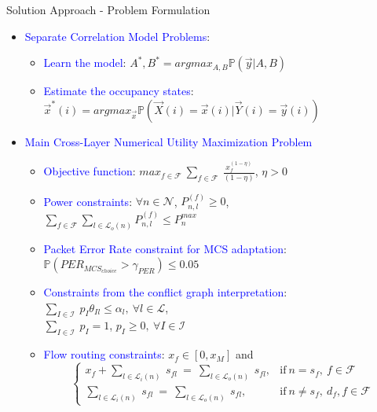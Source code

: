\documentclass{beamer}
\begin{document}
\begin{frame}{Solution Approach - Problem Formulation}
    \begin{itemize}
        \item \textcolor{blue}{Separate Correlation Model Problems}:
        \begin{itemize}
            \item \textcolor{blue}{Learn the model}:
            $A^*, B^* = argmax_{A, B} \mathbb{P}(\vec{y} | A, B)$
            \begingroup
            \fontsize{8pt}{8pt}\selectfont
                [MLE]
            \endgroup
            \item \textcolor{blue}{Estimate the occupancy states}: 
            $\Vec{x}^*(i) = argmax_{\Vec{x}} \mathbb{P}(\Vec{X}(i)=\Vec{x}(i)|\Vec{Y}(i)=\Vec{y}(i))$
            \begingroup
            \fontsize{8pt}{8pt}\selectfont
                [MAP]
            \endgroup
        \end{itemize}
        \item \textcolor{blue}{Main Cross-Layer Numerical Utility Maximization Problem}
        \begin{itemize}
            \item \textcolor{blue}{Objective function}: $max_{f \in \mathcal{F}}\ \sum_{f \in \mathcal{F}}\ \frac{x_f^{(1-\eta)}}{(1-\eta)}$, $\eta > 0$
            \item \textcolor{blue}{Power constraints}: $\forall n \in \mathcal{N}$, 
            $P_{n, l}^{(f)} \geq 0$, 
            \\$\sum_{f \in \mathcal{F}}\sum_{l \in \mathcal{L}_o(n)}P_{n,l}^{(f)} \leq P_n^{max}$
            \item \textcolor{blue}{Packet Error Rate constraint for MCS adaptation}: $\mathbb{P}(PER_{MCS_{choice}} > \gamma_{PER}) \leq 0.05$
            \item \textcolor{blue}{Constraints from the conflict graph interpretation}: $\sum_{I \in \mathcal{I}}\ p_I \theta_{Il} \leq \alpha_l,\ \forall l \in \mathcal{L}$, 
            \\$\sum_{I \in \mathcal{I}}\ p_I = 1$, $p_I \geq 0,\ \forall I \in \mathcal{I}$
            \item \textcolor{blue}{Flow routing constraints}: $x_f \in [0,x_M]$ and
            \begin{equation*}
                \begin{cases}
                    x_f + \sum_{l \in \mathcal{L}_i(n)}\ s_{fl}\ =\ \sum_{l \in \mathcal{L}_o(n)}\ s_{fl}, & \text{if}\ n=s_{f},\ f \in \mathcal{F}\\
                    \sum_{l \in \mathcal{L}_i(n)}\ s_{fl}\ =\ \sum_{l \in \mathcal{L}_o(n)}\ s_{fl}, & \text{if}\ n\not=s_{f},\ d_f, f \in \mathcal{F}
                \end{cases}
            \end{equation*}
        \end{itemize}
    \end{itemize}
\vskip 1cm
\end{frame}
\end{document}
